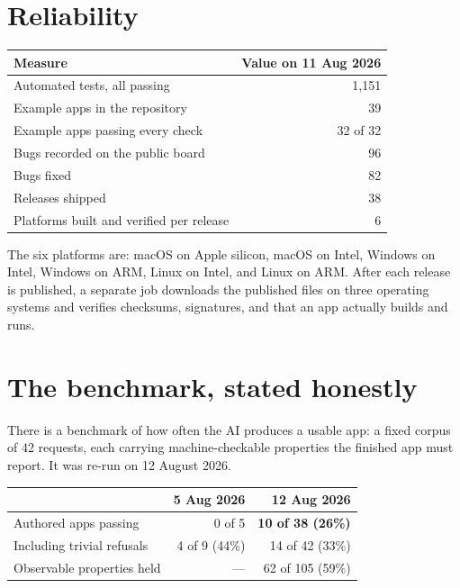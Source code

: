 \documentclass[11pt,a4paper]{report}
\begin{document}
\section{Reliability}

\begin{center}
\begin{tabular}{lr}
\toprule
\textbf{Measure} & \textbf{Value on 11 Aug 2026} \\
\midrule
Automated tests, all passing & 1{,}151 \\
Example apps in the repository & 39 \\
Example apps passing every check & 32 of 32 \\
Bugs recorded on the public board & 96 \\
Bugs fixed & 82 \\
Releases shipped & 38 \\
Platforms built and verified per release & 6 \\
\bottomrule
\end{tabular}
\end{center}

The six platforms are: macOS on Apple silicon, macOS on Intel, Windows on
Intel, Windows on ARM, Linux on Intel, and Linux on ARM. After each
release is published, a separate job downloads the published files on
three operating systems and verifies checksums, signatures, and that an
app actually builds and runs.

\section{The benchmark, stated honestly}

There is a benchmark of how often the AI produces a usable app: a fixed
corpus of 42 requests, each carrying machine-checkable properties the
finished app must report. It was re-run on 12 August 2026.

\begin{center}
\begin{tabular}{lrr}
\toprule
& \textbf{5 Aug 2026} & \textbf{12 Aug 2026} \\
\midrule
Authored apps passing & 0 of 5 & \textbf{10 of 38 (26\%)} \\
Including trivial refusals & 4 of 9 (44\%) & 14 of 42 (33\%) \\
Observable properties held & --- & 62 of 105 (59\%) \\
\bottomrule
\end{tabular}
\end{center}
\end{document}
